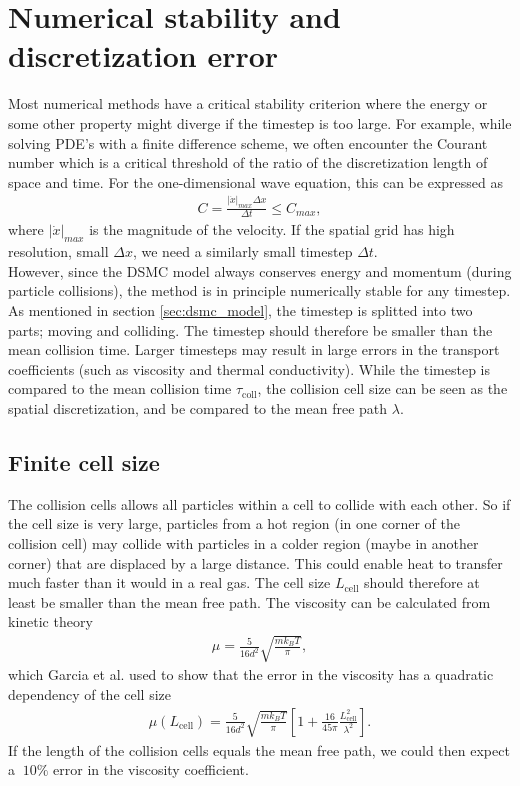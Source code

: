 \section{Numerical stability and discretization error}
\label{sec:dsmc_stability}
Most numerical methods have a critical stability criterion where the energy or some other property might diverge if the timestep is too large. For example, while solving PDE's with a finite difference scheme, we often encounter the Courant number which is a critical threshold of the ratio of the discretization length of space and time. For the one-dimensional wave equation, this can be expressed as
\begin{align}
	C = \frac{|\dot x|_{max} \Delta x}{\Delta t} \leq C_{max},
\end{align}
where $|\dot x|_{max}$ is the magnitude of the velocity. If the spatial grid has high resolution, small $\Delta x$, we need a similarly small timestep $\Delta t$.\\
However, since the DSMC model always conserves energy and momentum (during particle collisions), the method is in principle numerically stable for any timestep. As mentioned in section \ref{sec:dsmc_model}, the timestep is splitted into two parts; moving and colliding. The timestep should therefore be smaller than the mean collision time. Larger timesteps may result in large errors in the transport coefficients (such as viscosity and thermal conductivity)\cite{karniadakis2005microflows}. While the timestep is compared to the mean collision time $\tau_\text{coll}$, the collision cell size can be seen as the spatial discretization, and be compared to the mean free path $\lambda$. 
\subsection{Finite cell size}
The collision cells allows all particles within a cell to collide with each other. So if the cell size is very large, particles from a hot region (in one corner of the collision cell) may collide with particles in a colder region (maybe in another corner) that are displaced by a large distance. This could enable heat to transfer much faster than it would in a real gas. The cell size $L_\text{cell}$ should therefore at least be smaller than the mean free path\cite{karniadakis2005microflows}. The viscosity can be calculated from kinetic theory
\begin{align}
	\mu = \frac{5}{16d^2}\sqrt{\frac{mk_B T}{\pi}},
\end{align}
which Garcia et al. \cite{alexander1998cell} used to show that the error in the viscosity has a quadratic dependency of the cell size
\begin{align}
	\label{eq:viscosity_cell_size}
	\mu(L_\text{cell}) = \frac{5}{16d^2}\sqrt{\frac{mk_B T}{\pi}} \left [1 + \frac{16}{45\pi}\frac{L_\text{cell}^2}{\lambda^2}\right].
\end{align}
If the length of the collision cells equals the mean free path, we could then expect a $~10\%$ error in the viscosity coefficient.
